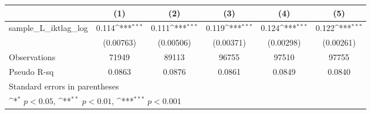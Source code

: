 {
\def\sym#1{\ifmmode^{#1}\else\(^{#1}\)\fi}
\begin{tabular}{l*{5}{c}}
\hline\hline
                &\multicolumn{1}{c}{(1)}         &\multicolumn{1}{c}{(2)}         &\multicolumn{1}{c}{(3)}         &\multicolumn{1}{c}{(4)}         &\multicolumn{1}{c}{(5)}         \\
\hline
sample\_L\_iktlag\_log&    0.114\sym{***}&    0.111\sym{***}&    0.119\sym{***}&    0.124\sym{***}&    0.122\sym{***}\\
                &(0.00763)         &(0.00506)         &(0.00371)         &(0.00298)         &(0.00261)         \\
\hline
Observations    &    71949         &    89113         &    96755         &    97510         &    97755         \\
Pseudo R-sq     &   0.0863         &   0.0876         &   0.0861         &   0.0849         &   0.0840         \\
\hline\hline
\multicolumn{6}{l}{\footnotesize Standard errors in parentheses}\\
\multicolumn{6}{l}{\footnotesize \sym{*} \(p<0.05\), \sym{**} \(p<0.01\), \sym{***} \(p<0.001\)}\\
\end{tabular}
}
